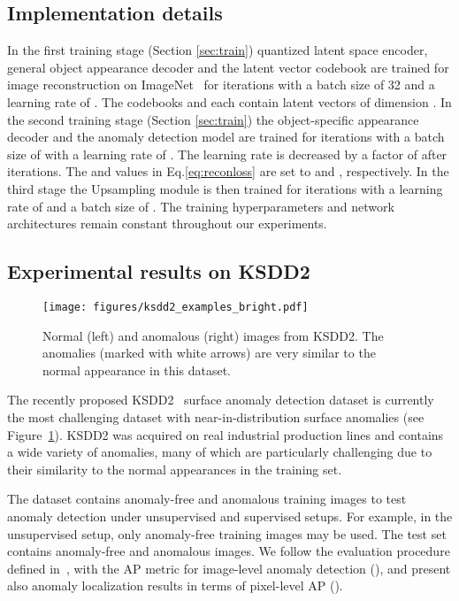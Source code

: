 \documentclass[runningheads]{llncs}
\begin{document}
\subsection{Implementation details}

In the first training stage (Section \ref{sec:train}) quantized latent space encoder, general object appearance decoder and the latent vector codebook are trained for image reconstruction on ImageNet~\cite{deng2009imagenet} for  iterations with a batch size of 32 and a learning rate of . The codebooks  and  each contain  latent vectors of dimension . In the second training stage (Section \ref{sec:train}) the object-specific appearance decoder and the anomaly detection model are trained for  iterations with a batch size of  with a learning rate of . The learning rate is decreased by a factor of  after  iterations. The  and   values in Eq.\ref{eq:reconloss} are set to  and , respectively. In the third stage the Upsampling module is then trained for  iterations with a learning rate of  and a batch size of . The training hyperparameters and network architectures remain constant throughout our experiments. 


\subsection{Experimental results on KSDD2}

\begin{figure}
\centering
  \texttt{[image: figures/ksdd2\_examples\_bright.pdf]}
\caption{
Normal (left) and anomalous (right) images from KSDD2. The anomalies (marked with white arrows) are very similar to the normal appearance in this dataset.}
\label{fig:ksdd2}
\end{figure}

The recently proposed KSDD2~\cite{bovzivc2021mixed} surface anomaly detection dataset is currently the most challenging dataset with near-in-distribution surface anomalies (see Figure~\ref{fig:ksdd2}). KSDD2 was acquired on real industrial production lines and contains a wide variety of anomalies, many of which are particularly challenging due to their similarity to the normal appearances in the training set.
 
The dataset contains  anomaly-free and  anomalous training images to test anomaly detection under unsupervised and supervised setups. For example, in the unsupervised setup, only anomaly-free training images may be used. The test set contains  anomaly-free and  anomalous images. We follow the evaluation procedure defined in~\cite{bovzivc2021mixed}, with the AP metric for image-level anomaly detection (), and present also anomaly localization results in terms of pixel-level AP (). 
\end{document}
